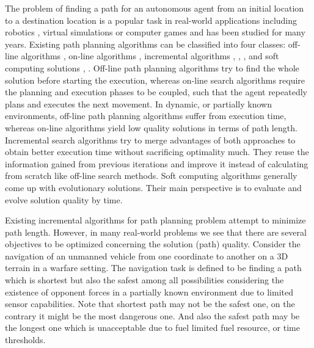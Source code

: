 \documentclass[10pt,journal]{IEEEtran}
\begin{document}
\lettrine{T}{}he problem of finding a path for an autonomous agent from an initial location to a destination location is a popular task in real-world applications including robotics \cite{Macwan:2014} \cite{Daqi:2013}, virtual simulations or computer games and has been studied for many years. Existing path planning algorithms can be classified into four classes: off-line algorithms \cite{Dijkstra:1959} \cite{AStarHart:1968}, on-line algorithms \cite{RTAStarKorf:1990}, incremental algorithms \cite{DStar:1994}, \cite{Koenig:2002}, \cite{FocussedDStarStentz:1995}, \cite{Yibiao:2011} and soft computing solutions \cite{Tarapata:2007}, \cite{Pangilinan}. Off-line path planning algorithms try to find the whole solution before starting the execution, whereas on-line search algorithms require the planning and execution phases to be coupled, such that the agent repeatedly plans and executes the next movement. In dynamic, or partially known environments, off-line path planning algorithms suffer from execution time, whereas on-line algorithms yield low quality solutions in terms of path length. Incremental search algorithms try to merge advantages of both approaches to obtain better execution time without sacrificing optimality much. They reuse the information gained from previous iterations and improve it instead of calculating from scratch like off-line search methods. Soft computing algorithms generally come up with evolutionary solutions. Their main perspective is to evaluate and evolve solution quality by time. 

Existing incremental algorithms for path planning problem attempt to minimize path length. However, in many real-world problems we see that there are several objectives to be optimized concerning the solution (path) quality. Consider the navigation of an unmanned vehicle from one coordinate to another on a 3D terrain in a warfare setting. The navigation task is defined to be finding a path which is shortest but also the safest among all possibilities considering the existence of opponent forces in a partially known environment due to limited sensor capabilities. Note that shortest path may not be the safest one, on the contrary it might be the most dangerous one. And also the safest path may be the longest one which is unacceptable due to fuel limited fuel resource, or time thresholds. 
\end{document}

